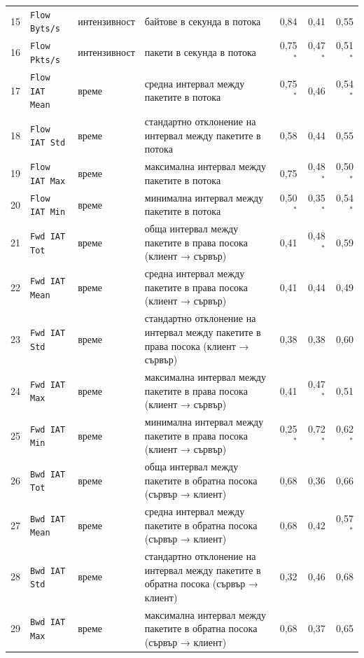 {{\begin{tabularx}{\textwidth}{@{}rl l Lrrr@{}}
15 & \texttt{Flow Byts/s} & интензивност & байтове в секунда в потока & 0,84 & 0,41 & 0,55\\
16 & \texttt{Flow Pkts/s} & интензивност & пакети в секунда в потока & 0,75$^{\ast}$ & 0,47$^{\ast}$ & 0,51$^{\ast}$\\
17 & \texttt{Flow IAT Mean} & време & средна интервал между пакетите в потока & 0,75$^{\ast}$ & 0,46 & 0,54$^{\ast}$\\
18 & \texttt{Flow IAT Std} & време & стандартно отклонение на интервал между пакетите в потока & 0,58 & 0,44 & 0,55\\
19 & \texttt{Flow IAT Max} & време & максимална интервал между пакетите в потока & 0,75 & 0,48$^{\ast}$ & 0,50$^{\ast}$\\
20 & \texttt{Flow IAT Min} & време & минимална интервал между пакетите в потока & 0,50$^{\ast}$ & 0,35$^{\ast}$ & 0,54$^{\ast}$\\
21 & \texttt{Fwd IAT Tot} & време & обща интервал между пакетите в права посока (клиент → сървър) & 0,41 & 0,48$^{\ast}$ & 0,59\\
22 & \texttt{Fwd IAT Mean} & време & средна интервал между пакетите в права посока (клиент → сървър) & 0,41 & 0,44 & 0,49\\
23 & \texttt{Fwd IAT Std} & време & стандартно отклонение на интервал между пакетите в права посока (клиент → сървър) & 0,38 & 0,38 & 0,60\\
24 & \texttt{Fwd IAT Max} & време & максимална интервал между пакетите в права посока (клиент → сървър) & 0,41 & 0,47$^{\ast}$ & 0,51\\
25 & \texttt{Fwd IAT Min} & време & минимална интервал между пакетите в права посока (клиент → сървър) & 0,25$^{\ast}$ & 0,72$^{\ast}$ & 0,62$^{\ast}$\\
26 & \texttt{Bwd IAT Tot} & време & обща интервал между пакетите в обратна посока (сървър → клиент) & 0,68 & 0,36 & 0,66\\
27 & \texttt{Bwd IAT Mean} & време & средна интервал между пакетите в обратна посока (сървър → клиент) & 0,68 & 0,42 & 0,57$^{\ast}$\\
28 & \texttt{Bwd IAT Std} & време & стандартно отклонение на интервал между пакетите в обратна посока (сървър → клиент) & 0,32 & 0,46 & 0,68\\
29 & \texttt{Bwd IAT Max} & време & максимална интервал между пакетите в обратна посока (сървър → клиент) & 0,68 & 0,37 & 0,65\\

\end{tabularx}}}
